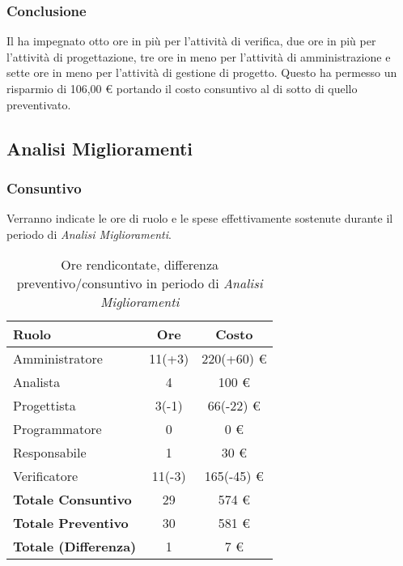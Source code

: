 \subsubsection{Conclusione}
Il  ha impegnato otto ore in pi\`u per l'attivit\`a di verifica, due ore in pi\`u per l'attivit\`a di progettazione, tre ore in meno per l'attivit\`a di amministrazione e sette ore in meno per l'attivit\`a di gestione di progetto. Questo ha permesso un risparmio di 106,00 \euro{} portando il costo consuntivo al di sotto di quello preventivato.

\newpage


\subsection{Analisi Miglioramenti}
\subsubsection{Consuntivo}
Verranno indicate le ore di ruolo e le spese effettivamente sostenute durante il periodo di \textit{Analisi Miglioramenti}.

\begin{table}[H]
	\centering
	\begin{tabular}{ l c c }
		\textbf{Ruolo} & \textbf{Ore} & \textbf{Costo} \\
		\hline
		Amministratore & 11(+3) & 220(+60) \euro{} \\
		Analista & 4 & 100 \euro{} \\
		Progettista & 3(-1) & 66(-22) \euro{} \\
		Programmatore & 0 & 0 \euro{} \\
		Responsabile & 1 & 30 \euro{} \\
		Verificatore & 11(-3) & 165(-45) \euro{} \\
		\hline
		\textbf{Totale Consuntivo} & 29 & 574 \euro{} \\
		\hline
		\textbf{Totale Preventivo} & 30 & 581 \euro{} \\
		\hline
		\textbf{Totale (Differenza)} & 1 & 7 \euro{} \\
		\hline
	\end{tabular}
	\caption{Ore rendicontate, differenza preventivo/consuntivo in periodo di \textit{Analisi Miglioramenti}}
\end{table}



